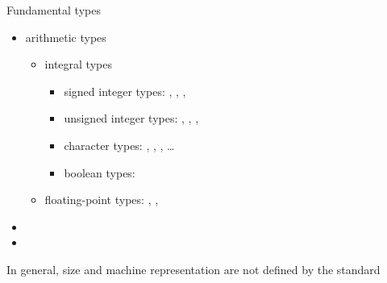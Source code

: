 \begin{frame}{Fundamental types}
  \begin{itemize}
    \item arithmetic types
      \begin{itemize}
        \item integral types
          \begin{itemize}
          \item signed integer types: , \alert<3->{},
            , 
          \item unsigned integer types: ,
            , , 
          \item character types: \alert<3->{}, ,
            , \ldots
          \item boolean types: \alert<3->{}
          \end{itemize}
        \item floating-point types: , \alert<3->{}, 
      \end{itemize}
    \item {}
    \item {}
  \end{itemize}

  \pause

  In general, size and machine representation are not defined by the
  standard

\end{frame}

